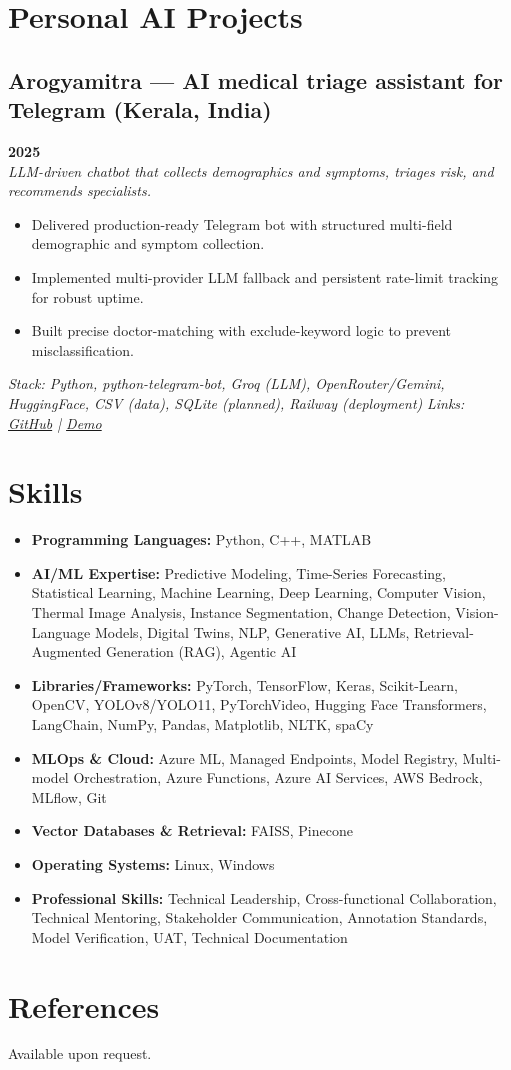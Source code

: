\documentclass[a4paper,10pt]{article}
\begin{document}
\section{Personal AI Projects}
\subsection{Arogyamitra — AI medical triage assistant for Telegram (Kerala, India)} \hfill \textbf{2025} \\
\textit{LLM-driven chatbot that collects demographics and symptoms, triages risk, and recommends specialists.}
\begin{itemize}
	\item Delivered production-ready Telegram bot with structured multi-field demographic and symptom collection.
	\item Implemented multi-provider LLM fallback and persistent rate-limit tracking for robust uptime.
	\item Built precise doctor-matching with exclude-keyword logic to prevent misclassification.
\end{itemize}
\textit{Stack: Python, python-telegram-bot, Groq (LLM), OpenRouter/Gemini, HuggingFace, CSV (data), SQLite (planned), Railway (deployment)}
\textit{Links: \href{https://github.com/rasheedhaq/arogy_bot}{GitHub} \;|\; \href{https://t.me/arogyamitr_bot}{Demo}}


\section*{Skills}
\begin{itemize}
	\item \textbf{Programming Languages:} Python, C++, MATLAB
	
	\item \textbf{AI/ML Expertise:} Predictive Modeling, Time-Series Forecasting, Statistical Learning, Machine Learning, Deep Learning, Computer Vision, Thermal Image Analysis, Instance Segmentation, Change Detection, Vision-Language Models, Digital Twins, NLP, Generative AI, LLMs, Retrieval-Augmented Generation (RAG), Agentic AI
	
	\item \textbf{Libraries/Frameworks:} PyTorch, TensorFlow, Keras, Scikit-Learn, OpenCV, YOLOv8/YOLO11, PyTorchVideo, Hugging Face Transformers, LangChain, NumPy, Pandas, Matplotlib, NLTK, spaCy
	
	\item \textbf{MLOps \& Cloud:} Azure ML, Managed Endpoints, Model Registry, Multi-model Orchestration, Azure Functions, Azure AI Services, AWS Bedrock, MLflow, Git
	
	\item \textbf{Vector Databases \& Retrieval:} FAISS, Pinecone
	
	\item \textbf{Operating Systems:} Linux, Windows
	
	\item \textbf{Professional Skills:} Technical Leadership, Cross-functional Collaboration, Technical Mentoring, Stakeholder Communication, Annotation Standards, Model Verification, UAT, Technical Documentation
\end{itemize}
	
\section*{References}
Available upon request.
	
\end{document}
